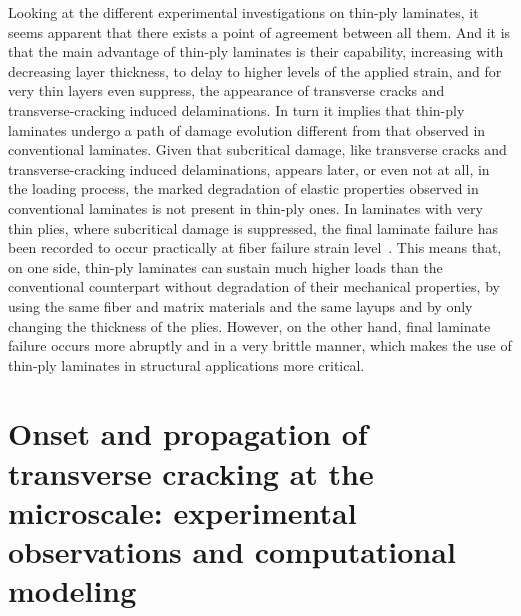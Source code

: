 Looking at the different experimental investigations on thin-ply laminates, it seems apparent that there exists a point of agreement between all them. And it is that the main advantage of thin-ply laminates is their capability, increasing with decreasing layer thickness, to delay to higher levels of the applied strain, and for very thin layers even suppress, the appearance of transverse cracks and transverse-cracking induced delaminations. In turn it implies that thin-ply laminates undergo a path of damage evolution different from that observed in conventional laminates. Given that subcritical damage, like transverse cracks and transverse-cracking induced delaminations, appears later, or even not at all, in the loading process, the marked degradation of elastic properties observed in conventional laminates is not present in thin-ply ones. In laminates with very thin plies, where subcritical damage is suppressed, the final laminate failure has been recorded to occur practically at fiber failure strain level~\cite{Cugnoni2018}. This means that, on one side, thin-ply laminates can sustain much higher loads than the conventional counterpart without degradation of their mechanical properties, by using the same fiber and matrix materials and the same layups and by only changing the thickness of the plies. However, on the other hand, final laminate failure occurs more abruptly and in a very brittle manner, which makes the use of thin-ply laminates in structural applications more critical.

\section{Onset and propagation of transverse cracking at the microscale: experimental observations and computational modeling}

